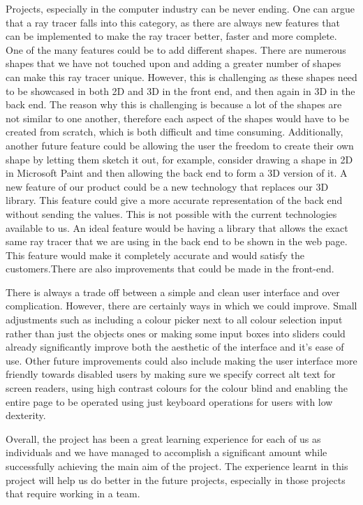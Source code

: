 \documentclass[a4paper]{report}
\begin{document}
	\par Projects, especially in the computer industry can be never ending. One can argue that a ray tracer falls into this category, as there are always new features that can be implemented to make the ray tracer better, faster and more complete. One of the many features could be to add different shapes. There are numerous shapes that we have not touched upon and adding a greater number of shapes can make this ray tracer unique. However, this is challenging as these shapes need to be showcased in both 2D and 3D in the front end, and then again in 3D in the back end. The reason why this is challenging is because a lot of the shapes are not similar to one another, therefore each aspect of the shapes would have to be created from scratch, which is both difficult and time consuming. Additionally, another future feature could be allowing the user the freedom to create their own shape by letting them sketch it out, for example, consider drawing a shape in 2D in Microsoft Paint and then allowing the back end to form a 3D version of it. A new feature of our product could be a new technology that replaces our 3D library. This feature could give a more accurate representation of the back end without sending the values. This is not possible with the current technologies available to us. An ideal feature would be having a library that allows the exact same ray tracer that we are using in the back end to be shown in the web page. This feature would make it completely accurate and would satisfy the customers.There are also improvements that could be made in the front-end.\newline
	
	\par There is always a trade off between a simple and clean user interface and over complication. However, there are certainly ways in which we could improve. Small adjustments such as including a colour picker next to all colour selection input rather than just the objects ones or making some input boxes into sliders could already significantly improve both the aesthetic of the interface and it's ease of use. Other future improvements could also include making the user interface more friendly towards disabled users by making sure we specify correct alt text for screen readers, using high contrast colours for the colour blind and enabling the entire page to be operated using just keyboard operations for users with low dexterity. \newline
	
	\par  Overall, the project has been a great learning experience for each of us as individuals and we have managed to accomplish a significant amount while successfully achieving the main aim of the project. The experience learnt in this project will help us do better in the future projects, especially in those projects that require working in a team.
	
\end{document}
